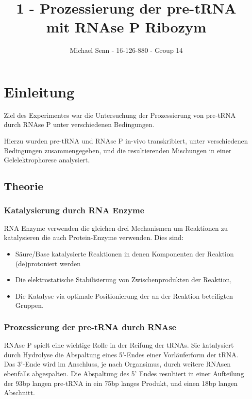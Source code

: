 \documentclass[a4paper,english]{scrreprt}
\title{1 - Prozessierung der pre-tRNA mit RNAse P Ribozym}
\author{Michael Senn \maillink{michael.senn@students.unibe.ch} - 16-126-880 - Group 14}
\date{\printdate}
\begin{document}
\maketitle

\chapter{Einleitung}

Ziel des Experimentes war die Untersuchung der Prozessierung von pre-tRNA durch
RNAse P unter verschiedenen Bedingungen.

Hierzu wurden pre-tRNA und RNAse P in-vivo transkribiert, unter verschiedenen
Bedingungen zusammengegeben, und die resultierenden Mischungen in einer
Gelelektrophorese analysiert.

\section{Theorie}

\subsection{Katalysierung durch RNA Enzyme}

RNA Enzyme verwenden die gleichen drei Mechanismen um Reaktionen zu
katalysieren die auch Protein-Enzyme verwenden. Dies sind:
\begin{itemize}
	\item Säure/Base katalysierte Reaktionen in denen Komponenten der
		Reaktion (de)protoniert werden
	\item Die elektrostatische Stabilisierung von Zwischenprodukten der
		Reaktion,
	\item Die Katalyse via optimale Positionierung der an der Reaktion
		beteiligten Gruppen.
\end{itemize}

\subsection{Prozessierung der pre-tRNA durch RNAse}

RNAse P spielt eine wichtige Rolle in der Reifung der tRNAs. Sie katalysiert
durch Hydrolyse die Abspaltung eines 5'-Endes einer Vorläuferform der tRNA. Das
3'-Ende wird im Anschluss, je nach Organsimus, durch weitere RNAsen ebenfalls
abgespalten. Die Abspaltung des 5' Endes resultiert in einer Aufteilung der
93bp langen pre-tRNA in ein 75bp langes Produkt, und einen 18bp langen
Abschnitt.
\end{document}

